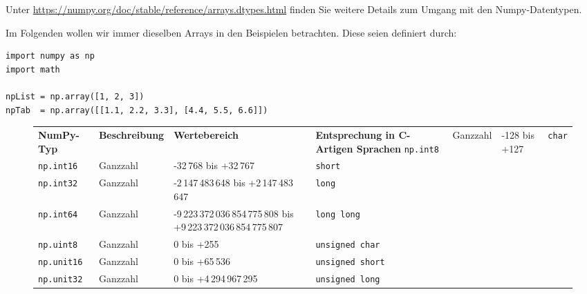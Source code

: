 Unter \url{https://numpy.org/doc/stable/reference/arrays.dtypes.html} finden Sie weitere Details zum Umgang mit den Numpy-Datentypen.

Im Folgenden wollen wir immer dieselben Arrays in den Beispielen betrachten. Diese seien definiert durch:
\begin{codebox}
\begin{verbatim}
import numpy as np
import math

npList = np.array([1, 2, 3])
npTab  = np.array([[1.1, 2.2, 3.3], [4.4, 5.5, 6.6]])
\end{verbatim}
\end{codebox}

\begin{figure}[h]  %
\begin{tcolorbox}[title=Übliche NumPy-Datentypen]
\begin{center}
\begin{tabular}{lm{.15\linewidth}m{.3\linewidth}m{.25\linewidth}}
	\textbf{NumPy-Typ}     & \textbf{Beschreibung} & \textbf{Wertebereich} & \textbf{Entsprechung in C-Artigen Sprachen} \tabcrlf
	\texttt{np.int8}       & Ganzzahl & -128 bis +127                                                                            & \texttt{char} \\
	\texttt{np.int16}      & Ganzzahl & -32\,768 bis +32\,767                                                                    & \texttt{short} \\
	\texttt{np.int32}      & Ganzzahl & -2\,147\,483\,648 bis +2\,147\,483\,647                                                  & \texttt{long} \\
	\texttt{np.int64}      & Ganzzahl & -9\,223\,372\,036\,854\,775\,808 bis +9\,223\,372\,036\,854\,775\,807                    & \texttt{long long} \\
	\texttt{np.uint8}      & Ganzzahl & 0 bis +255                                                                               & \texttt{unsigned char} \\
	\texttt{np.unit16}     & Ganzzahl & 0 bis +65\,536                                                                           & \texttt{unsigned short} \\
	\texttt{np.unit32}     & Ganzzahl & 0 bis +4\,294\,967\,295                                                                  & \texttt{unsigned long} \\

\end{tabular}
\end{center}
\end{tcolorbox}
\end{figure}
